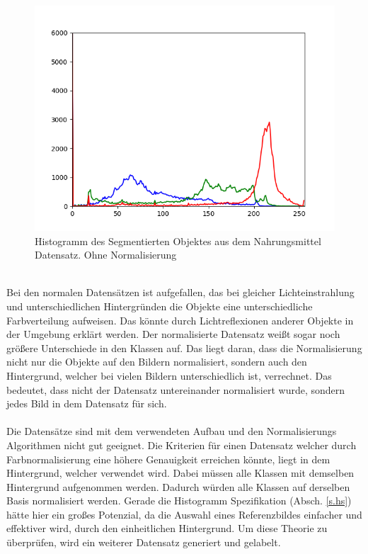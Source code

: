 \documentclass[a4paper,12pt,oneside]{article}
\begin{document}
\begin{figure}[htb]
\begin{minipage}[c]{0.08\textwidth}
\end{minipage}
\hfill
\begin{minipage}[c]{0.3\textwidth}
\includegraphics[width=\textwidth]{Sources/Bild2_histo.png}
\end{minipage}
\caption{Histogramm des Segmentierten Objektes aus dem Nahrungsmittel Datensatz. Ohne Normalisierung}
\label{img:evalnorm}
\end{figure}\\
Bei den normalen Datensätzen ist aufgefallen, das bei gleicher Lichteinstrahlung und unterschiedlichen Hintergründen die Objekte eine unterschiedliche Farbverteilung aufweisen. Das könnte durch Lichtreflexionen anderer Objekte in der Umgebung erklärt werden. Der normalisierte Datensatz weißt sogar noch größere Unterschiede in den Klassen auf. Das liegt daran, dass die Normalisierung nicht nur die Objekte auf den Bildern normalisiert, sondern auch den Hintergrund, welcher bei vielen Bildern unterschiedlich ist, verrechnet. Das bedeutet, dass nicht der Datensatz untereinander normalisiert wurde, sondern jedes Bild in dem Datensatz für sich.\\\\
Die Datensätze sind mit dem verwendeten Aufbau und den Normalisierungs Algorithmen nicht gut geeignet. Die Kriterien für einen Datensatz welcher durch Farbnormalisierung eine höhere Genauigkeit erreichen könnte, liegt in dem Hintergrund, welcher verwendet wird. Dabei müssen alle Klassen mit demselben Hintergrund aufgenommen werden. Dadurch würden alle Klassen auf derselben Basis normalisiert werden. Gerade die Histogramm Spezifikation (Absch. \ref{s.hs}) hätte hier ein großes Potenzial, da die Auswahl eines Referenzbildes einfacher und effektiver wird, durch den einheitlichen Hintergrund. Um diese Theorie zu überprüfen, wird ein weiterer Datensatz generiert und gelabelt. 
\end{document}
